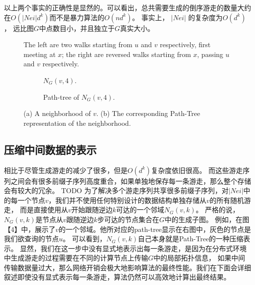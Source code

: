 \documentclass[master]{njuthesis}
\begin{document}
以上两个事实的正确性是显然的。可以看出，总共需要生成的倒序游走的数量大约在$O(|Nei|d^k)$而不是暴力算法的$O(nd^k)$。
事实上， $|Nei|$ 的复杂度为$O(d^k)$， 远比图$G$中点数目小，并且独立于$G$真实大小。

\begin{figure}[t]
\centering
\label{fig:graph1}
\resizebox{!}{!}{}
\caption{The left are two walks starting from $u$ and $v$ respectively, first meeting at $x$; the right are reversed walks starting from $x$, passing $u$ and $v$ respectively.}\label{fig:one}
\end{figure}


\begin{figure}[t]
    \centering
    \begin{subfigure}[b]{0.48\linewidth}        %
        \centering
        \label{fig:match_walks_one}
	\resizebox{!}{!}{}
	\caption{$N_G(v, 4)$.}
	
	\end{subfigure}
    \begin{subfigure}[b]{0.48\linewidth}        %
     \centering
	\resizebox{!}{!}{}
	\caption{Path-tree of $N_G(v, 4)$.}
	\label{fig:match_walks_two}
    \end{subfigure}
    \caption{(a) A neighborhood of $v $.  (b) The corresponding Path-Tree representation of the neighborhood.}
    \label{fig:match_walks}
\end{figure}

\subsection{压缩中间数据的表示}
相比于尽管生成游走的减少了很多，但是$O(d^k)$复杂度依旧很高。
而这些游走序列之间会有很多前缀子序列高度重合，如果单独地保存每一条游走，那么整个存储会有较大的冗余。
TODO
为了解决多个游走序列共享很多前缀子序列，对$|Nei|$中的每一个节点$v$，我们并不使用任何特别设计的数据结构单独存储从$v$的所有随机游走，
而是直接使用从$v$开始跟随逆边$k$可达的一个邻域$N_{G}(v, k)$。
严格的说，$N_{G}(v, k)$是节点从$v$跟随逆边$k$步可达的节点集合在$G$中的生成子图。
例如，在图【4】中，展示了$v$的一个邻域。他所对应的path-tree显示在右图中，灰色的节点是我们欲查询的节点$u$。
可以看到，$N_{G}(v, k)$自己本身就是Path-Tree的一种压缩表示。
显然，我们在这一步中没有显式地表示出每一条游走，是因为在分布式环境中生成游走的过程需要在不同的计算节点上传输$G$中的局部拓扑信息，
如果中间传输数据量过大，那么网络开销会极大地影响算法的最终性能。我们在下面会详细叙述即使没有显式表示每一条游走，算法仍然可以高效地计算出最终结果。
\end{document}
